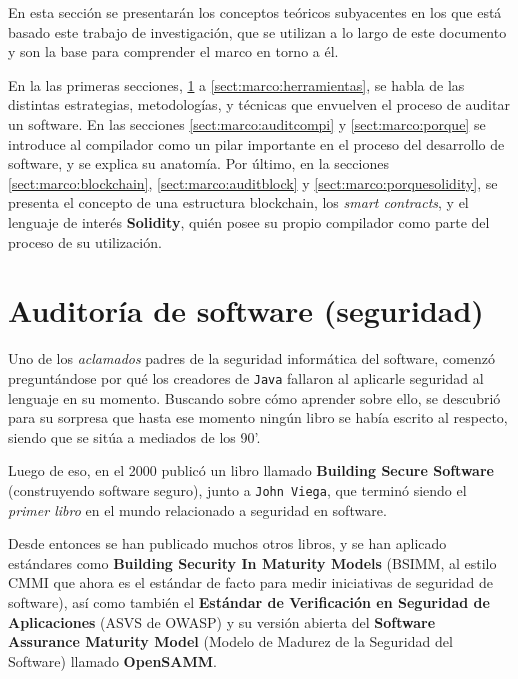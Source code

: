 En esta sección se presentarán los conceptos teóricos subyacentes en los que está basado este trabajo de investigación, que se utilizan a lo largo de este documento y son la base para comprender el marco en torno a él.

En la las primeras secciones, \ref{sect:marco:auditoria} a \ref{sect:marco:herramientas}, se habla de las distintas estrategias, metodologías, y técnicas que envuelven el proceso de auditar un software. En las secciones \ref{sect:marco:auditcompi} y \ref{sect:marco:porque} se introduce al compilador como un pilar importante en el proceso del desarrollo de software, y se explica su anatomía. Por último, en la secciones \ref{sect:marco:blockchain}, \ref{sect:marco:auditblock} y \ref{sect:marco:porquesolidity}, se presenta el concepto de una estructura blockchain, los \textit{smart contracts}, y el lenguaje de interés \textbf{Solidity}, quién posee su propio compilador como parte del proceso de su utilización.

\section{Auditoría de software (seguridad)}
\label{sect:marco:auditoria}
Uno de los \textit{aclamados} padres de la seguridad informática del software, comenzó preguntándose por qué los creadores de \texttt{Java} fallaron al aplicarle seguridad al lenguaje en su momento. Buscando sobre cómo aprender sobre ello, se descubrió para su sorpresa que hasta ese momento ningún libro se había escrito al respecto, siendo que se sitúa a mediados de los 90'.

Luego de eso, en el 2000 publicó un libro llamado \textbf{Building Secure Software} (construyendo software seguro), junto a \texttt{John Viega}, que terminó siendo el \textit{primer libro} en el mundo relacionado a seguridad en software.

Desde entonces se han publicado muchos otros libros\cite{McGraw:2006:SSB:1121680}\cite{Shostack:2014:TMD:2829295}\cite{Hoglund:2004:ESB:984253}\cite{Howard:2009:DSS:1594832}\cite{Klein:2011:BHD:2823924}\cite{Allen:2008:SSE:1386212}\cite{Wysopal:2006:ASS:1196390}\cite{Ransome:2013:CSS:2613389}, y se han aplicado estándares como \textbf{Building Security In Maturity Models}\cite{McGraw:2015:SSB:2675327.2675329} (BSIMM, al estilo CMMI que ahora es el estándar de facto para medir iniciativas de seguridad de software), así como también el \textbf{Estándar de Verificación en Seguridad de Aplicaciones}\cite{OWASP:AVSP} (ASVS de OWASP) y su versión abierta del \textbf{Software Assurance Maturity Model} (Modelo de Madurez de la Seguridad del Software) llamado \textbf{OpenSAMM}\cite{OWASP:OpenSAMM}.


